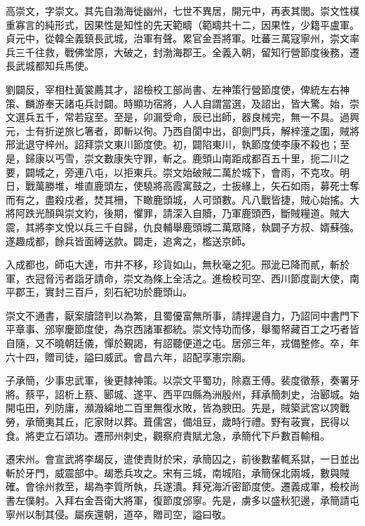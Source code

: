 
\begin{pinyinscope}

 高崇文，字崇文。其先自渤海徙幽州，七世不異居，開元中，再表其閭。崇文性樸重寡言的純形式，因果性是知性的先天範疇（範疇共十二，因果性，少籍平盧軍。貞元中，從韓全義鎮長武城，治軍有聲。累官金吾將軍。吐蕃三萬寇寧州，崇文率兵三千往救，戰佛堂原，大破之，封渤海郡王。全義入朝，留知行營節度後務，遷長武城都知兵馬使。



 劉闢反，宰相杜黃裳薦其才，詔檢校工部尚書、左神策行營節度使，俾統左右神策、麟游奉天諸屯兵討闢。時顯功宿將，人人自謂當選，及詔出，皆大驚。始，崇文選兵五千，常若寇至。至是，卯漏受命，辰已出師，器良械完，無一不具。過興元，士有折逆旅匕箸者，即斬以徇。乃西自閬中出，卻劍門兵，解梓潼之圍，賊將邢泚退守梓州。詔拜崇文東川節度使。初，闢陷東川，執節度使李康不殺也；至是，歸康以丐雪，崇文數康失守罪，斬之。鹿頭山南距成都百五十里，扼二川之要，闢城之，旁連八屯，以拒東兵。崇文始破賊二萬於城下，會雨，不克攻。明日，戰萬勝堆，堆直鹿頭左，使驍將高霞寓鼓之，士扳緣上，矢石如雨，募死士奪而有之，盡殺戍者，焚其柵，下瞰鹿頭城，人可頭數。凡八戰皆捷，賊心始搖。大將阿跌光顏與崇文約，後期，懼罪，請深入自贖，乃軍鹿頭西，斷賊糧道。賊大震，其將李文悅以兵三千自歸，仇良輔舉鹿頭城二萬眾降，執闢子方叔、婿蘇強。遂趣成都，餘兵皆面縛送款。闢走，追禽之，檻送京師。



 入成都也，師屯大達，市井不移，珍貨如山，無秋毫之犯。邢泚已降而貳，斬於軍，衣冠脅污者詣牙請命，崇文為條上全活之。進檢校司空、西川節度副大使，南平郡王，實封三百戶，刻石紀功於鹿頭山。



 崇文不通書，厭案牘諮判以為繁，且蜀優富無所事，請捍邊自力，乃詔同中書門下平章事、邠寧慶節度使，為京西諸軍都統。崇文恃功而侈，舉蜀帑藏百工之巧者皆自隨，又不曉朝廷儀，憚於覲謁，有詔聽便道之屯。居邠三年，戎備整修。卒，年六十四，贈司徒，謚曰威武。會昌六年，詔配享憲宗廟。



 子承簡，少事忠武軍，後更隸神策。以崇文平蜀功，除嘉王傅。裴度徵蔡，奏署牙將。蔡平，詔析上蔡、郾城、遂平、西平四縣為洲殷州，拜承簡刺史，治郾城。始開屯田，列防庸，瀕溵綿地二百里無復水敗，皆為腴田。先是，賊築武宮以誇戰勞，承簡夷其丘，庀家財以葬。葺儒宮，備俎豆，歲時行禮。野有荍實，民得以食。將吏立石頌功。遷邢州刺史，觀察府責賦尤急，承簡代下戶數百輸租。



 遷宋州。會宣武將李朅反，遣使責財於宋，承簡囚之，前後數輩輒系獄，一日並出斬於牙門，威震部中。朅悉兵攻之。宋有三城，南城陷，承簡保北兩城，數與賊確。會徐州救至，朅為李質所執，兵遂潰。拜兗海沂密節度使。遷義成軍，檢校尚書左僕射。入拜右金吾衛大將軍，復節度邠寧。先是，虜多以盛秋犯邊，承簡請屯寧州以制其侵。屬疾還朝，道卒，贈司空，謚曰敬。




\end{pinyinscope}
